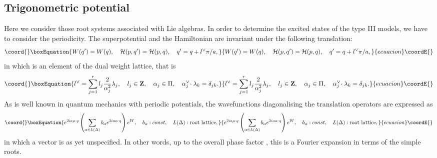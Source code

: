 \documentclass[a4paper,12pt]{article}
\begin{document}
\subsection{Trigonometric potential}
\label{triginvcase}
Here we consider those root systems associated with Lie algebras.
In order to determine the excited states of the type III models,
 we have to consider the periodicity.
The superpotential \coordHE{} and the Hamiltonian \coordHE{} are invariant
under
the following translation:
\begin{equation}\coord{}\boxEquation{
   W(q^\prime)=W(q),\quad
   {\cal H}(p, q^\prime)={\cal H}(p, q),\quad
   q^\prime=q+l^\vee\pi/a,
}{
   W(q^\prime)=W(q),\quad
   {\cal H}(p, q^\prime)={\cal H}(p, q),\quad
   q^\prime=q+l^\vee\pi/a,
}{ecuacion}\coordE{}\end{equation}
in which \coordHE{} is an element of the dual weight lattice, that is
\begin{equation}\coord{}\boxEquation{
   l^\vee=\sum_{j=1}^r l_j{2\over{\alpha_j^2}}\lambda_j,\quad l_j\in
   {\bf Z},\quad \alpha_j\in\Pi,\quad
   \alpha_j^\vee\!\cdot\lambda_k=\delta_{jk}.
}{
   l^\vee=\sum_{j=1}^r l_j{2\over{\alpha_j^2}}\lambda_j,\quad l_j\in
   {\bf Z},\quad \alpha_j\in\Pi,\quad
   \alpha_j^\vee\!\cdot\lambda_k=\delta_{jk}.
}{ecuacion}\coordE{}\end{equation}
As is well known in quantum mechanics with periodic potentials,
the wavefunctions diagonalising the translation operators
are expressed as
\begin{equation}\coord{}\boxEquation{
   e^{2ia\mu\cdot q}\left(\sum_{\alpha\in
   L(\Delta)}b_{\alpha}e^{2ia\alpha\cdot q}\right)e^W,\quad b_\alpha :
   const,
   \quad L(\Delta): \mbox{root lattice},
}{
   e^{2ia\mu\cdot q}\left(\sum_{\alpha\in
   L(\Delta)}b_{\alpha}e^{2ia\alpha\cdot q}\right)e^W,\quad b_\alpha :
   const,
   \quad L(\Delta): \mbox{root lattice},
}{ecuacion}\coordE{}\end{equation}
in which a vector \coordHE{} is as yet unspecified. In
other words, up to the overall phase factor \coordHE{}, this
is a Fourier expansion in terms of the simple roots.
\end{document}
